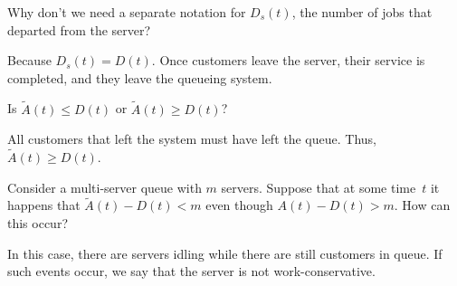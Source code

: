 \begin{extra}
 Why don't we need a separate notation for $D_s(t)$, the number of jobs that departed from the server?
\begin{solution}
 Because $D_s(t) = D(t)$. Once customers leave the server,
 their service is completed, and they leave the queueing system.
\end{solution}
\end{extra}

\begin{extra}
 Is $\tilde A(t) \leq D(t)$ or $\tilde A(t) \geq D(t)$?
\begin{solution}
 All customers that left the system must have left the
 queue. Thus, $\tilde A(t) \geq D(t)$.
\end{solution}
\end{extra}



\begin{extra}
 Consider a multi-server queue with $m$ servers.
 Suppose that at some time~$t$ it happens that $\tilde A(t) - D(t) < m$ even though $A(t) - D(t) > m$.
 How can this occur?
\begin{solution}
 In this case, there are servers idling while there are still
 customers in queue. If such events occur, we say that the server
 is not work-conservative.
\end{solution}
\end{extra}


